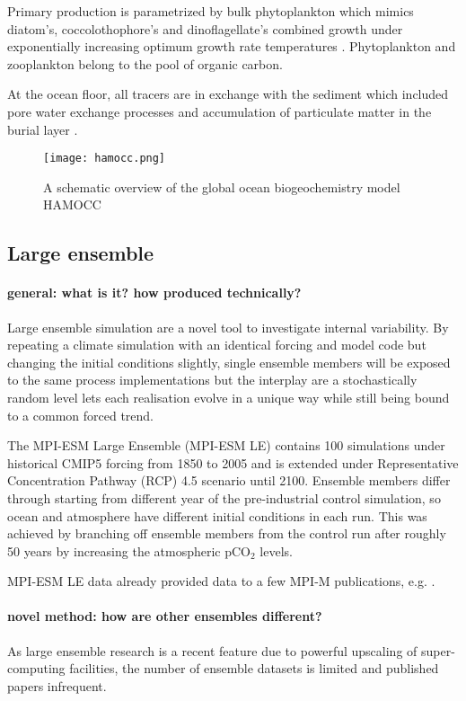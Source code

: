 \documentclass[12pt]{article}
\begin{document}
Primary production is parametrized by bulk phytoplankton which mimics diatom's, coccolothophore's and dinoflagellate's combined growth under exponentially increasing optimum growth rate temperatures \citep{Eppley1972}. Phytoplankton and zooplankton belong to the pool of organic carbon. 

At the ocean floor, all tracers are in exchange with the sediment which included pore water exchange processes and accumulation of particulate matter in the burial layer \citep{Heinze1991}.



\begin{figure}[h!]
	\centering
	\texttt{[image: hamocc.png]}
	\caption{A schematic overview of the global ocean biogeochemistry model HAMOCC \citep{Ilyina2013}}
	\label{fig:HAMOCC}
\end{figure}

\subsection{Large ensemble}
\paragraph{general: what is it? how produced technically?}
Large ensemble simulation are a novel tool to investigate internal variability. By repeating a climate simulation with an identical forcing and model code but changing the initial conditions slightly, single ensemble members will be exposed to the same process implementations but the interplay are a stochastically random level lets each realisation evolve in a unique way while still being bound to a common forced trend.
 
The MPI-ESM Large Ensemble (MPI-ESM LE) contains 100 simulations under historical CMIP5 forcing from 1850 to 2005 and is extended under Representative Concentration Pathway (RCP) 4.5 scenario until 2100. Ensemble members differ through starting from different year of the pre-industrial control simulation, so ocean and atmosphere have different initial conditions in each run. This was achieved by branching off ensemble members from the control run after roughly 50 years by increasing the atmospheric pCO$_2$ levels.

MPI-ESM LE data already provided data to a few MPI-M publications, e.g. \citep{Marotzke2015,Bittner2016}.

\paragraph{novel method: how are other ensembles different?} 
As large ensemble research is a recent feature due to powerful upscaling of super-computing facilities, the number of ensemble datasets is limited and published papers infrequent.
\end{document}
